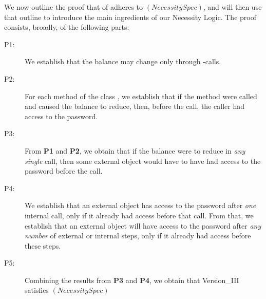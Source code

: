 
We  now outline the proof that of  adheres to $(NecessitySpec)$,
and  will then use that outline to 
 introduce the main ingredients of our Necessity Logic. The proof consists,
broadly, of the following parts:

\begin{description}
\item[P1:] We establish that the balance 
 may change only   through -\internalC calls.  

\item[P2:] 
For each method of the class  ,  we establish that   
if the method were called and  caused the  balance to reduce, then, before the call,
the caller had access  to the password.

\item[P3:]  
From \textbf{P1} and \textbf{P2}, we obtain that if the balance were to 
reduce in \emph{any}  \emph{single} call, then some
external object would have to have had access to the password before the call.

\item[P4:] We establish %
that   an external object has access to 
the password after \emph{one} internal call, only if it already had access before that call.
From that, we establish  that  an external object will have access to 
the password after \emph{any number} of external or internal 
steps, only if it already had access before these steps.

\item[P5:] Combining  the results from \textbf{P3} and \textbf{P4}, we obtain
that  Version\_III satisfies $(NecessitySpec)$

\end{description} 
 
